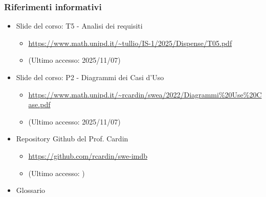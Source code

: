\documentclass[a4paper,12pt]{article}
\begin{document}
{{            \subsubsection{Riferimenti informativi} {
                \begin{itemize}
                    \item Slide del corso: T5 - Analisi dei requisiti
                    \begin{itemize}
                        \item \url{https://www.math.unipd.it/~tullio/IS-1/2025/Dispense/T05.pdf}
                        \item[] (Ultimo accesso: 2025/11/07)
                    \end{itemize}
                    \item Slide del corso: P2 - Diagrammi dei Casi d'Uso
                    \begin{itemize}
                        \item \url{https://www.math.unipd.it/~rcardin/swea/2022/Diagrammi\%20Use\%20Case.pdf}
                        \item[] (Ultimo accesso: 2025/11/07)
                    \end{itemize}
                    \item Repository Github del Prof. Cardin
                    \begin{itemize}
                        \item \url{https://github.com/rcardin/swe-imdb}
                        \item[] (Ultimo accesso: )
                    \end{itemize}
                    \item Glossario
                \end{itemize}
            }
        }
    }

    \newpage
\end{document}
